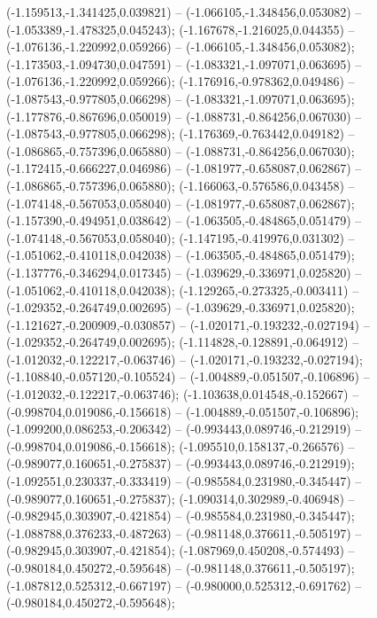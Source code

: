  (-1.159513,-1.341425,0.039821) -- (-1.066105,-1.348456,0.053082) -- (-1.053389,-1.478325,0.045243);
 (-1.167678,-1.216025,0.044355) -- (-1.076136,-1.220992,0.059266) -- (-1.066105,-1.348456,0.053082);
 (-1.173503,-1.094730,0.047591) -- (-1.083321,-1.097071,0.063695) -- (-1.076136,-1.220992,0.059266);
 (-1.176916,-0.978362,0.049486) -- (-1.087543,-0.977805,0.066298) -- (-1.083321,-1.097071,0.063695);
 (-1.177876,-0.867696,0.050019) -- (-1.088731,-0.864256,0.067030) -- (-1.087543,-0.977805,0.066298);
 (-1.176369,-0.763442,0.049182) -- (-1.086865,-0.757396,0.065880) -- (-1.088731,-0.864256,0.067030);
 (-1.172415,-0.666227,0.046986) -- (-1.081977,-0.658087,0.062867) -- (-1.086865,-0.757396,0.065880);
 (-1.166063,-0.576586,0.043458) -- (-1.074148,-0.567053,0.058040) -- (-1.081977,-0.658087,0.062867);
 (-1.157390,-0.494951,0.038642) -- (-1.063505,-0.484865,0.051479) -- (-1.074148,-0.567053,0.058040);
 (-1.147195,-0.419976,0.031302) -- (-1.051062,-0.410118,0.042038) -- (-1.063505,-0.484865,0.051479);
 (-1.137776,-0.346294,0.017345) -- (-1.039629,-0.336971,0.025820) -- (-1.051062,-0.410118,0.042038);
 (-1.129265,-0.273325,-0.003411) -- (-1.029352,-0.264749,0.002695) -- (-1.039629,-0.336971,0.025820);
 (-1.121627,-0.200909,-0.030857) -- (-1.020171,-0.193232,-0.027194) -- (-1.029352,-0.264749,0.002695);
 (-1.114828,-0.128891,-0.064912) -- (-1.012032,-0.122217,-0.063746) -- (-1.020171,-0.193232,-0.027194);
 (-1.108840,-0.057120,-0.105524) -- (-1.004889,-0.051507,-0.106896) -- (-1.012032,-0.122217,-0.063746);
 (-1.103638,0.014548,-0.152667) -- (-0.998704,0.019086,-0.156618) -- (-1.004889,-0.051507,-0.106896);
 (-1.099200,0.086253,-0.206342) -- (-0.993443,0.089746,-0.212919) -- (-0.998704,0.019086,-0.156618);
 (-1.095510,0.158137,-0.266576) -- (-0.989077,0.160651,-0.275837) -- (-0.993443,0.089746,-0.212919);
 (-1.092551,0.230337,-0.333419) -- (-0.985584,0.231980,-0.345447) -- (-0.989077,0.160651,-0.275837);
 (-1.090314,0.302989,-0.406948) -- (-0.982945,0.303907,-0.421854) -- (-0.985584,0.231980,-0.345447);
 (-1.088788,0.376233,-0.487263) -- (-0.981148,0.376611,-0.505197) -- (-0.982945,0.303907,-0.421854);
 (-1.087969,0.450208,-0.574493) -- (-0.980184,0.450272,-0.595648) -- (-0.981148,0.376611,-0.505197);
 (-1.087812,0.525312,-0.667197) -- (-0.980000,0.525312,-0.691762) -- (-0.980184,0.450272,-0.595648);
